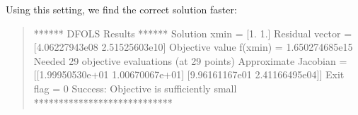 \documentclass[letterpaper,10pt,english]{sphinxmanual}
\begin{document}
Using this setting, we find the correct solution faster:
\begin{quote}

\begin{sphinxVerbatim}[commandchars=\\\{\}]
****** DFO\PYGZhy{}LS Results ******
Solution xmin = [1. 1.]
Residual vector = [\PYGZhy{}4.06227943e\PYGZhy{}08  2.51525603e\PYGZhy{}10]
Objective value f(xmin) = 1.650274685e\PYGZhy{}15
Needed 29 objective evaluations (at 29 points)
Approximate Jacobian = [[\PYGZhy{}1.99950530e+01  1.00670067e+01]
 [\PYGZhy{}9.96161167e\PYGZhy{}01 \PYGZhy{}2.41166495e\PYGZhy{}04]]
Exit flag = 0
Success: Objective is sufficiently small
****************************
\end{sphinxVerbatim}
\end{quote}
\end{document}
